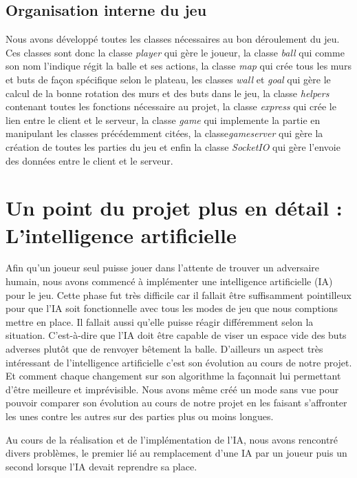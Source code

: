 \subsection{Organisation interne du jeu}

Nous avons développé toutes les classes nécessaires au bon déroulement du jeu. Ces classes sont donc la classe \emph{player} qui gère le joueur, la classe \emph{ball} qui comme son nom l'indique régit la balle et ses actions, la classe \emph{map} qui crée tous les murs et buts de façon spécifique selon le plateau, les classes \emph{wall} et \emph{goal} qui gère le calcul de la bonne rotation des murs et des buts dans le jeu, la classe \emph{helpers} contenant toutes les fonctions nécessaire au projet, la classe \emph{express} qui crée le lien entre le client et le serveur,  la classe \emph{game} qui implemente la partie en manipulant les classes précédemment citées, la classe\emph{gameserver} qui gère la création de toutes les parties du jeu et enfin la classe \emph{SocketIO} qui gère l'envoie des données entre le client et le serveur.\\

\section{Un point du projet plus en détail : L'intelligence artificielle}

Afin qu'un joueur seul puisse jouer dans l'attente de trouver un adversaire humain, nous avons commencé à implémenter une intelligence artificielle (IA) pour le jeu. Cette phase fut très difficile car il fallait être suffisamment pointilleux pour que l'IA soit fonctionnelle avec tous les modes de jeu que nous comptions mettre en place. Il fallait aussi qu'elle puisse réagir différemment selon la situation. C'est-à-dire que l'IA doit être capable de viser un espace vide des buts adverses plutôt que de renvoyer bêtement la balle. D'ailleurs un aspect très intéressant de l'intelligence artificielle c'est son évolution au cours de notre projet. Et comment chaque changement sur son algorithme la façonnait lui permettant d'être meilleure et imprévisible. Nous avons même créé un mode sans vue pour pouvoir comparer son évolution au cours de notre projet en les faisant s'affronter les unes contre les autres sur des parties plus ou moins longues.


Au cours de la réalisation et de l'implémentation de l'IA, nous avons rencontré divers problèmes, le premier lié au remplacement d'une IA par un joueur puis un second lorsque l'IA devait reprendre sa place.


